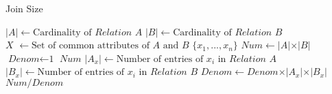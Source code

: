 \documentclass{article}
\begin{document}
\begin{algorithm}
\caption{Join Size}\label{euclid}
\begin{algorithmic}[1]
\State $\vert \textit{A}\vert \gets \text{Cardinality of }\textit{Relation A}$
\State $\vert \textit{B}\vert \gets \text{Cardinality of }\textit{Relation B}$
\State $ \textit{X } \gets \text{Set of common attributes of} \textit{ A } \text{and}  \textit{ B } \{x_1,...,x_n\} $
\State $ \textit{Num} \gets \vert \textit{A}\vert  \times \vert \textit{B}\vert $
\State $ \textit{Denom} \gets \text{1} $
\State \Return $Num$
\Else
{}
\State $\vert A_x \vert \gets \text{Number of entries of } x_i \text{ in }\textit{Relation A}$
\State $\vert B_x \vert \gets \text{Number of entries of } x_i \text{ in }\textit{Relation B}$
\State $ \textit{Denom} \gets \textit{Denom} \times \vert A_x \vert  \times \vert B_x \vert  $
\State \Return $Num/ Denom$

\EndFor
\EndIf


\EndProcedure
\end{algorithmic}
\end{algorithm}
\end{document}
